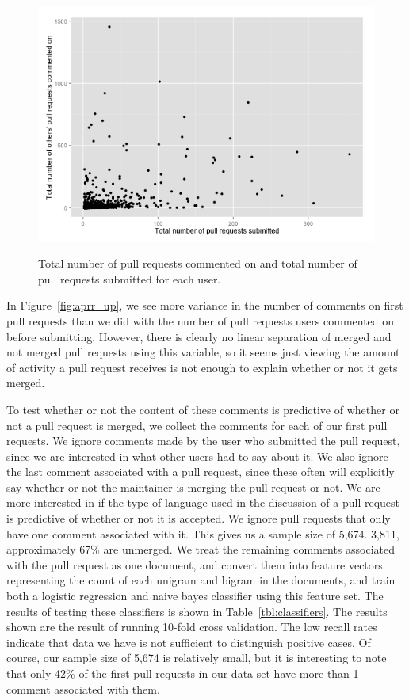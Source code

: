 \documentclass{iitthesis}
\begin{document}
\begin{figure}[p] \centering \label{fig:commented_pullrequests_totals}
\includegraphics[scale=0.6]{figures/commented_pullrequests_totals_ggplot.png}
\caption{Total number of pull requests commented on and total number of pull
requests submitted for each user.} \end{figure}

In Figure~\ref{fig:aprr_up}, we see more variance in the number of comments on
first pull requests than we did with the number of pull requests users commented
on before submitting. However, there is clearly no linear separation of merged
and not merged pull requests using this variable, so it seems just viewing the
amount of activity a pull request receives is not enough to explain whether or
not it gets merged.

To test whether or not the content of these comments is predictive of whether or
not a pull request is merged, we collect the comments for each of our first pull
requests. We ignore comments made by the user who submitted the pull request,
since we are interested in what other users had to say about it. We also ignore
the last comment associated with a pull request, since these often will
explicitly say whether or not the maintainer is merging the pull request or not.
We are more interested in if the type of language used in the discussion of a
pull request is predictive of whether or not it is accepted. We ignore pull
requests that only have one comment associated with it. This gives us a sample
size of 5,674. 3,811, approximately 67\% are unmerged. We treat the remaining
comments associated with the pull request as one document, and convert them into
feature vectors representing the count of each unigram and bigram in the
documents, and train both a logistic regression and naive bayes classifier using
this feature set. The results of testing these classifiers is shown in
Table~\ref{tbl:classifiers}. The results shown are the result of running 10-fold
cross validation. The low recall rates indicate that data we have is not
sufficient to distinguish positive cases. Of course, our sample size of 5,674 is
relatively small, but it is interesting to note that only 42\% of the first pull
requests in our data set have more than 1 comment associated with them.
\end{document}
